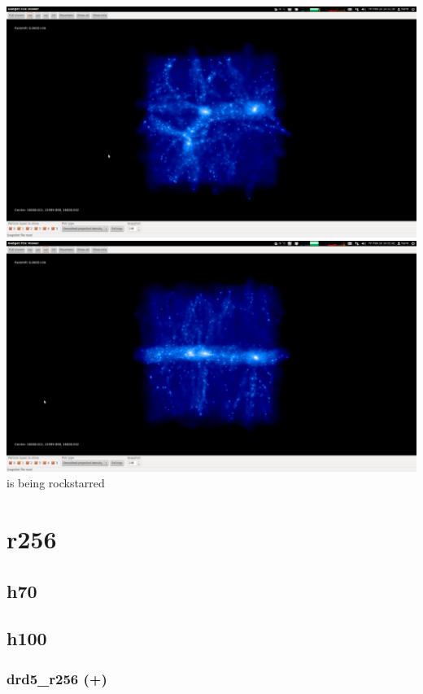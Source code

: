 \documentclass[a4paper,11pt,fleqn,oneside]{book}
\begin{document}
\includegraphics[scale=0.12]{drdx_h100_r128_2/1.png} 
\includegraphics[scale=0.12]{drdx_h100_r128_2/2.png} 
is being rockstarred 




\newpage
\section{r256} %

\newpage
\subsection{h70} %
 
\newpage
\subsection{h100} %

\subsubsection{drd5\_r256 (+)} 
\end{document}
